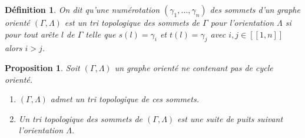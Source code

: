 \documentclass[a4paper,10pt]{article}
\newtheorem{defi}[thm]{Définition}%
\newtheorem{prop}[thm]{Proposition}%
\begin{document}
\begin{defi}
	On dit qu'une numérotation $(\gamma_{1}, \dots, \gamma_{n})$ des sommets d'un graphe orienté $(\Gamma,\Lambda)$ est un \emph{tri topologique} des sommets de $\Gamma$ pour l'orientation $\Lambda$ si pour tout arête $l$ de $\Gamma$ telle que $s(l) = \gamma_{i}$ et $t(l) = \gamma_{j}$ avec  $i,j \in [\![1,n]\!]$ alors $i>j$.
\end{defi}
\begin{prop}
\label{tri-topo}
Soit $(\Gamma,\Lambda)$ un graphe orienté ne contenant pas de cycle orienté.
  \begin{enumerate}
  \item $(\Gamma,\Lambda)$ admet un tri topologique de ces sommets.
  \item Un tri topologique des sommets de $(\Gamma,\Lambda)$ est une suite de puits suivant l'orientation $\Lambda$.
  \end{enumerate}
\end{prop}
\end{document}
